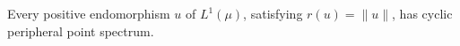 Every positive endomorphism $u$ of $L^1(\mu)$, satisfying $r(u) = \|u\|$, has cyclic peripheral point spectrum.
